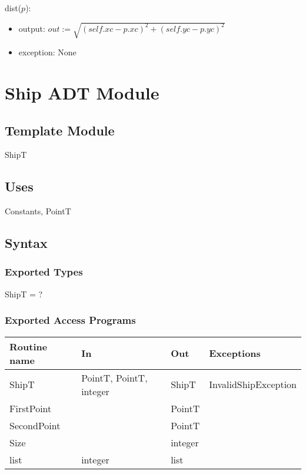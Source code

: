 \documentclass[12pt]{article}
\begin{document}
\noindent dist($p$):
\begin{itemize}
\item output: $out := \sqrt{(\mathit{self}.xc - p.xc)^2 + (\mathit{self}.yc - p.yc)^2}$
\item exception: None
\end{itemize}

\newpage

\section* {Ship ADT Module}

\subsection*{Template Module}

ShipT

\subsection* {Uses}

Constants, PointT

\subsection* {Syntax}

\subsubsection* {Exported Types}

ShipT = ?

\subsubsection* {Exported Access Programs}

\begin{tabular}{| l | l | l | l |}
\hline
\textbf{Routine name} & \textbf{In} & \textbf{Out} & \textbf{Exceptions}\\
\hline
ShipT & PointT, PointT, integer & ShipT & InvalidShipException\\
\hline
FirstPoint & ~ & PointT & ~\\
\hline
SecondPoint & ~ & PointT & ~\\
\hline
Size & ~ & integer & ~\\
\hline
list & integer & list & ~\\
\hline
\end{tabular}
\end{document}
